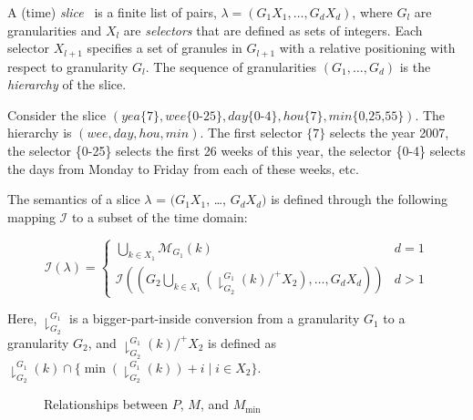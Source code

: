 \documentclass[abstracton,12pt]{scrreprt}
\begin{document}
A (time) \emph{slice}~\cite{Niezette92} is a finite list of pairs,
$\lambda = (G_1X_1,\ldots,G_dX_d)$, where $G_l$ are granularities and
$X_l$ are \emph{selectors} that are defined as sets of integers.  Each
selector $X_{l+1}$ specifies a set of granules in $G_{l+1}$ with a
relative positioning with respect to granularity $G_l$.  The sequence
of granularities $(G_1,\ldots,G_d)$ is the \emph{hierarchy} of the
slice.  

Consider the slice $(\mathit{yea}\{7\}, \mathit{wee}\{\text{0-25}\},
\mathit{day}\{\text{0-4}\}, \mathit{hou}\{7\},
\mathit{min}\{\text{0,25,55}\})$.  The hierarchy is $(\mathit{wee},
\mathit{day}, \mathit{hou}, \mathit{min})$.  The first selector
$\{7\}$ selects the year 2007, the selector \{0-25\} selects the first
26 weeks of this year, the selector \{0-4\} selects the days from
Monday to Friday from each of these weeks, etc.

The semantics of a slice $\lambda$ = $(G_1X_1$, \ldots, $G_dX_d)$ is
defined through the following mapping $\mathcal{I}$ to a subset of the
time domain:

\begin{equation*}
  \mathcal{I} (\lambda) =
  \begin{cases}
    \bigcup_{k \in X_1} \mathcal{M}_{G_1}(k) & d=1 \\[1ex]
    \mathcal{I} \left( (G_2\bigcup_{k \in X_1}(
      \downharpoonright^{G_1}_{G_2}(k)/^+X_2), \ldots, G_dX_d)
    \right) & d>1
  \end{cases}
\end{equation*}

Here, $\downharpoonright^{G_1}_{G_2}$ is a bigger-part-inside
conversion from a granularity $G_1$ to a granularity $G_2$, and
$\downharpoonright^{G_1}_{G_2}(k)/^+X_2$ is defined as
$\downharpoonright^{G_1}_{G_2}(k) \cap \{
\min(\downharpoonright^{G_1}_{G_2}(k)) + i \mid i \in X_2 \}$.

\begin{figure}[htbp]\centering
  \caption{Relationships between $P$, $M$, and $M_\mathrm{min}$}
  \label{fig:ch2-singular-minimal-mapping}
\end{figure}
\end{document}

